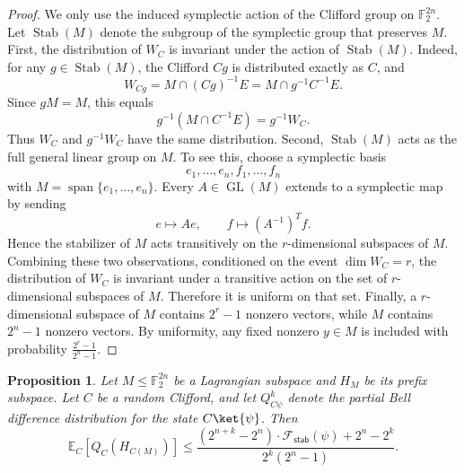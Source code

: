 \documentclass[11pt]{article}
\newtheorem{proposition}[theorem]{Proposition}
\newcommand{\Fe}{\ensuremath{\mathcal{F}}}
\begin{document}
\begin{proof}
We only use the induced symplectic action of the Clifford group on
$\mathbb F_2^{2n}$.  Let $\operatorname{Stab}(M)$ denote the subgroup of
the symplectic group that preserves $M$. First, the distribution of $W_C$ is invariant under the action of
$\operatorname{Stab}(M)$.  Indeed, for any $g\in \operatorname{Stab}(M)$,
the Clifford $Cg$ is distributed exactly as $C$, and
$$
    W_{Cg}
    =
    M\cap (Cg)^{-1}E
    =
    M\cap g^{-1}C^{-1}E.
$$
Since $gM=M$, this equals
$$
    g^{-1}(M\cap C^{-1}E)
    =
    g^{-1}W_C.
$$
Thus $W_C$ and $g^{-1}W_C$ have the same distribution. Second, $\operatorname{Stab}(M)$ acts as the full general linear group on
$M$.  To see this, choose a symplectic basis
$$
    e_1,\ldots,e_n,f_1,\ldots,f_n
$$
with
$
    M=\operatorname{span}\{e_1,\ldots,e_n\}.
$
Every $A\in \operatorname{GL}(M)$ extends to a symplectic map by sending
$$
    e\mapsto Ae,
    \qquad
    f\mapsto (A^{-1})^{T}f.
$$
Hence the stabilizer of $M$ acts transitively on the
$r$-dimensional subspaces of $M$. Combining these two observations, conditioned on the event
$\dim W_C=r$, the distribution of $W_C$ is invariant under a transitive
action on the set of $r$-dimensional subspaces of $M$.  Therefore it is
uniform on that set. Finally, a $r$-dimensional subspace of $M$ contains $2^r-1$ nonzero
vectors, while $M$ contains $2^n-1$ nonzero vectors.  By uniformity, any
fixed nonzero $y\in M$ is included with probability $\frac{2^r-1}{2^n-1}$.
\end{proof}
\begin{proposition}
\label{prop:clifford-average}
Let $M\le\mathbb F_2^{2n}$ be a Lagrangian subspace and $H_M$ be its
prefix subspace.  Let $C$ be a random Clifford, and let $Q^k_{C\psi}$
denote the partial Bell difference distribution for the state $C\ket{\psi}$.  Then
$$
    \mathbb E_C[Q_C(H_{C(M)})]
    \le
    \frac{(2^{n+k}-2^n)\cdot \Fe_{\textsf{stab}}(\psi)+2^n-2^k}{2^k(2^n-1)}.
$$
\end{proposition}
\end{document}
